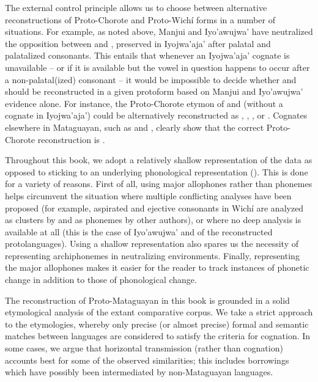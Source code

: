 The external control principle allows us to choose between alternative reconstructions of Proto-Chorote and Proto-Wichí forms in a number of situations. For example, as noted above, Manjui and Iyo’awujwa’ have neutralized the opposition between  and , preserved in Iyojwa’aja’ after palatal and palatalized consonants. This entails that whenever an Iyojwa’aja’ cognate is unavailable -- or if it is available but the vowel in question happens to occur after a non-palatal(ized) consonant -- it would be impossible to decide whether  and  should be reconstructed in a given protoform based on Manjui and Iyo’awujwa’ evidence alone. For instance, the Proto-Chorote etymon of  and  (without a cognate in Iyojwa’aja’) could be alternatively reconstructed as , , , or . Cognates elsewhere in Mataguayan, such as  and , clearly show that the correct Proto-Chorote reconstruction is .

Throughout this book, we adopt a relatively shallow representation of the data as opposed to sticking to an underlying phonological representation (). This is done for a variety of reasons. First of all, using major allophones rather than phonemes helps circumvent the situation where multiple conflicting analyses have been proposed (for example, aspirated and ejective consonants in Wichí are analyzed as clusters by  and as phonemes by other authors), or where no deep analysis is available at all (this is the case of Iyo’awujwa’ and of the reconstructed protolanguages). Using a shallow representation also spares us the necessity of representing archiphonemes in neutralizing environments. Finally, representing the major allophones makes it easier for the reader to track instances of phonetic change in addition to those of phonological change.

The reconstruction of Proto-Mataguayan in this book is grounded in a solid etymological analysis of the extant comparative corpus. We take a strict approach to the etymologies, whereby only precise (or almost precise) formal and semantic matches between languages are considered to satisfy the criteria for cognation. In some cases, we argue that horizontal transmission (rather than cognation) accounts best for some of the observed similarities; this includes borrowings which have possibly been intermediated by non-Mataguayan languages.

